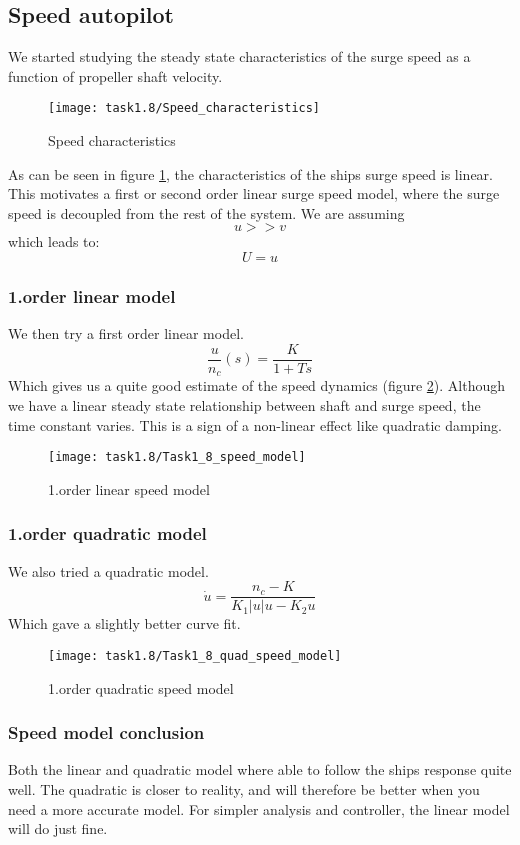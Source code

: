 \subsection{Speed autopilot}\label{subsec:prob1.2}
We started studying the steady state characteristics of the surge speed as a function of propeller shaft velocity. 
\begin{figure}[H]
    \centering
    \texttt{[image: task1.8/Speed\_characteristics]}
    \caption{Speed characteristics}
    \label{fig:1.8-ss}
\end{figure}
As can be seen in figure \ref{fig:1.8-ss}, the characteristics of the ships surge speed is linear. This motivates a first or second order linear surge speed model, where the surge speed is decoupled from the rest of the system. We are assuming $$u>>v$$ which leads to: $$U=u$$ 
\subsubsection*{1.order linear model}
We then try a first order linear model.
\begin{equation}
\frac{u}{n_c}(s) = \frac{K}{1+Ts}
\end{equation}
Which gives us a quite good estimate of the speed dynamics (figure \ref{fig:1.8-speed-model}). Although we have a linear steady state relationship between shaft and surge speed, the time constant varies. This is a sign of a non-linear effect like quadratic damping.
\begin{figure}[H]
    \centering
    \texttt{[image: task1.8/Task1\_8\_speed\_model]}
    \caption{1.order linear speed model}
    \label{fig:1.8-speed-model}
\end{figure}
\subsubsection*{1.order quadratic model}
We also tried a quadratic model.
\begin{equation}
\dot{u} = \frac{n_c-K}{K_1 | u | u - K_2 u}
\end{equation}
Which gave a slightly better curve fit.
\begin{figure}[H]
    \centering
    \texttt{[image: task1.8/Task1\_8\_quad\_speed\_model]}
    \caption{1.order quadratic speed model}
    \label{fig:1.8-quad-speed-model}
\end{figure}
\subsubsection*{Speed model conclusion}
Both the linear and quadratic model where able to follow the ships response quite well. The quadratic is closer to reality, and will therefore be better when you need a more accurate model. For simpler analysis and controller, the linear model will do just fine. 

